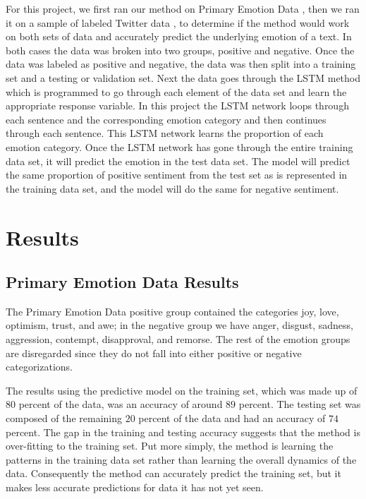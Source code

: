 \documentclass[titlepage,letterpaper]{article}
\begin{document}
For this project, we first ran our method on Primary Emotion Data \cite{lowriwilliams}, then we ran it on a sample of labeled Twitter data \cite{LabeledTwitter}, to determine if the method would work on both sets of data and accurately predict the underlying emotion of a text. In both cases the data was broken into two groups, positive and negative. Once the data was labeled as positive and negative, the data was then split into a training set and a testing or validation set. Next the data goes through the LSTM method which is programmed to go through each element of the data set and learn the appropriate response variable. In this project the LSTM network loops through each sentence and the corresponding emotion category and then continues through each sentence. This LSTM network learns the proportion of each emotion category. Once the LSTM network has gone through the entire training data set, it will predict the emotion in the test data set. The model will predict the same proportion of positive sentiment from the test set as is represented in the training data set, and the model will do the same for negative sentiment. 

\section{Results}

\subsection{Primary Emotion Data Results}
The Primary Emotion Data positive group contained the categories joy, love, optimism, trust, and awe; in the negative group we have anger, disgust, sadness, aggression, contempt, disapproval, and remorse. The rest of the emotion groups are disregarded since they do not fall into either positive or negative categorizations.

The results using the predictive model on the training set, which was made up of $80$ percent of the data, was an accuracy of around $89$ percent. The testing set was composed of the remaining $20$ percent of the data and had an accuracy of $74$ percent. The gap in the training and testing accuracy suggests that the method is over-fitting to  the training set. Put more simply, the method is learning the patterns in the training data set rather than learning the overall dynamics of the data. Consequently the method can accurately predict the training set, but it makes less accurate predictions for data it has not yet seen.
\end{document}
